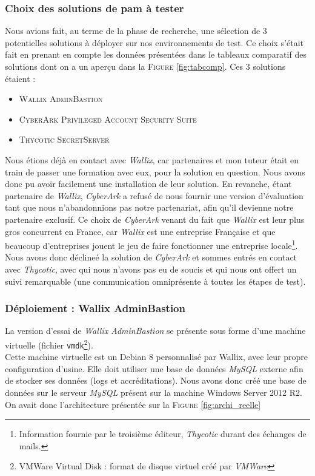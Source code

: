 \subsubsection{Choix des solutions de \gls{pam} à tester}
\label{par:choixsol}

Nous avions fait, au terme de la phase de recherche, une sélection de 3 potentielles solutions à déployer sur nos environnements de test. Ce choix s'était fait en prenant en compte les données présentées dans le tableaux comparatif des solutions dont on a un aperçu dans la \textsc{Figure} \ref{fig:tabcomp}. Ces 3 solutions étaient :
\begin{itemize}
	\item \textsc{Wallix AdminBastion}
	\item \textsc{CyberArk Privileged Account Security Suite}
	\item \textsc{Thycotic SecretServer}
\end{itemize}

Nous étions déjà en contact avec \emph{Wallix}, car partenaires et mon tuteur était en train de passer une formation avec eux, pour la solution en question. Nous avons donc pu avoir facilement une installation de leur solution. En revanche, étant partenaire de \emph{Wallix}, \emph{CyberArk} a refusé de nous fournir une version d'évaluation tant que nous n'abandonnions pas notre partenariat, afin qu'il devienne notre partenaire exclusif. Ce choix de \emph{CyberArk} venant du fait que \emph{Wallix} est leur plus gros concurrent en France, car \emph{Wallix} est une entreprise Française et que beaucoup d'entreprises jouent le jeu de faire fonctionner une entreprise locale\footnote{Information fournie par le troisième éditeur, \emph{Thycotic} durant des échanges de mails.}. Nous avons donc déclineé la solution de \emph{CyberArk} et sommes entrés en contact avec \emph{Thycotic}, avec qui nous n'avons pas eu de soucis et qui nous ont offert un suivi remarquable (une communication omniprésente à toutes les étapes de test).

\subsubsection{Déploiement : Wallix AdminBastion}
\label{par:wallix}

La version d'essai de \emph{Wallix AdminBastion} se présente sous forme d'une machine virtuelle (fichier \texttt{vmdk}\footnote{VMWare Virtual Disk : format de disque virtuel créé par \emph{VMWare}}).\\
Cette machine virtuelle est un Debian 8 personnalisé par Wallix, avec leur propre configuration d'usine. Elle doit utiliser une base de données \emph{MySQL} externe afin de stocker ses données (logs et accréditations). Nous avons donc créé une base de données sur le serveur \emph{MySQL} présent sur la machine Windows Server 2012 R2. On avait donc l'architecture présentée sur la \textsc{Figure} \ref{fig:archi_reelle}

